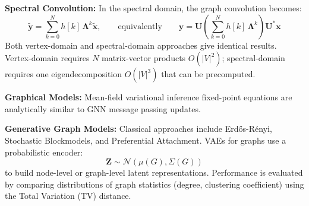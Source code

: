 \documentclass[12pt]{article}
\begin{document}
\textbf{Spectral Convolution:} In the spectral domain, the graph convolution becomes:
\[
\tilde{\bm{y}} = \sum_{k=0}^N h[k]\,\bm{\Lambda}^k\tilde{\bm{x}}, \qquad \text{equivalently} \qquad \bm{y} = \bm{U}\!\left(\sum_{k=0}^N h[k]\,\bm{\Lambda}^k\right)\!\bm{U}^*\bm{x}
\]
Both vertex-domain and spectral-domain approaches give identical results. Vertex-domain requires $N$ matrix-vector products $O(|V|^2)$; spectral-domain requires one eigendecomposition $O(|V|^3)$ that can be precomputed.

\textbf{Graphical Models:} Mean-field variational inference fixed-point equations are analytically similar to GNN message passing updates.

\textbf{Generative Graph Models:} Classical approaches include Erd\H{o}s-R\'enyi, Stochastic Blockmodels, and Preferential Attachment. VAEs for graphs use a probabilistic encoder:
\[
\bm{Z} \sim \mathcal{N}(\mu(G), \Sigma(G))
\]
to build node-level or graph-level latent representations. Performance is evaluated by comparing distributions of graph statistics (degree, clustering coefficient) using the Total Variation (TV) distance.
\end{document}
